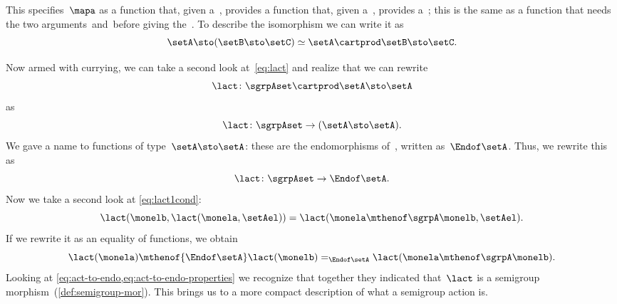 This specifies~$\mapa$ as a function that, given a~\setA, provides a function that, given a~\setB, provides a~\setC;
this is the same as a function that needs the two arguments~\setA and~\setB before giving the~\setC.
To describe the isomorphism we can write it as
\begin{equation}
    \label{eq:currying-iso-1}
    \setA \sto ( \setB \sto \setC) \simeq  \setA \cartprod \setB \sto \setC.
\end{equation}


Now armed with currying, we can take a second look at~\cref{eq:lact} and realize that we can rewrite
\begin{equation}
    \label{eq:currying-lact-1}
    \lact \colon \sgrpAset \cartprod \setA \sto \setA
\end{equation}
as
\begin{equation}
    \label{eq:currying-lact-2}
    \lact \colon \sgrpAset \to (\setA \sto \setA).
\end{equation}
%
We gave a name to functions of type~$\setA \sto \setA$: these are the endomorphisms of~\setA, written as~$\Endof\setA$.
Thus, we rewrite this as
%
\begin{equation}
    \label{eq:act-to-endo}
    \lact \colon \sgrpAset \to \Endof\setA.
\end{equation}
%
Now we take a second look at \cref{eq:lact1cond}:
%
\begin{equation}
    \label{eq:lact1cond-2}
    \lact(\monelb, \lact(\monela, \setAel)) = \lact(\monela \mthenof\sgrpA \monelb, \setAel).
\end{equation}
%
If we rewrite it as an equality of functions, we obtain
%
\begin{equation}
    \label{eq:act-to-endo-properties}
    \lact(\monela) \mthenof{\Endof\setA}  \lact(\monelb) =_{\Endof\setA} \lact(\monela \mthenof\sgrpA \monelb).
\end{equation}
%
Looking at \cref{eq:act-to-endo,eq:act-to-endo-properties} we recognize that together they indicated that~$\lact$ is a semigroup morphism~(\cref{def:semigroup-mor}).
This brings us to a more compact description of what a semigroup action is.

